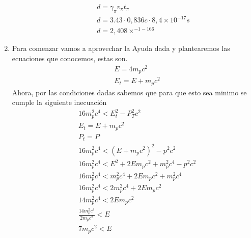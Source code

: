 \documentclass[12pt]{exam}
\begin{document}
\begin{enumerate}
\begin{enumerate}
\begin{align*}
          & d = \gamma_\pi v_\pi t_\pi\\
          & d = 3.43\cdot 0,836c \cdot 8,4\times10^{-17}s\\
          & d = 2,408\times^{-1-166}
        \end{align*}
    \end{enumerate}
  \item Para comenzar vamos a aprovechar la Ayuda dada y plantearemos las ecuaciones que conocemos, estas son.
    \begin{align*}
      &E = 4m_pc^2\\
      &E_t = E + m_pc^2
    \end{align*}
    Ahora, por las condiciones dadas sabemos que para que esto sea minimo se cumple la siguiente inecuación
    \begin{align*}
      & 16 m_p^2c^4 < E_t^2 - P^2_Tc^2\\
      & E_t = E + m_pc^2\\
      & P_t = P\\
      & 16 m_p^2c^4 < (E + m_pc^2)^2 - p^2c^2\\
      & 16 m_p^2c^4 < E^2 + 2Em_pc^2 + m_p^2c^4 - p^2c^2\\
      & 16 m_p^2c^4 < m_p^2c^4 + 2Em_pc^2 + m_p^2c^4\\
      & 16 m_p^2c^4 < 2m_p^2c^4 + 2Em_pc^2\\
      & 14 m_p^2c^4 < 2Em_pc^2\\
      & \frac{14 m_p^2c^4}{2m_pc^2} < E\\
      & 7m_pc^2 < E\\
    \end{align*}
\end{enumerate}
\end{document}
